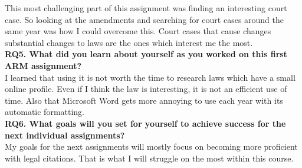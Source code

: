 \documentclass[12pt]{article}
\begin{document}
This most challenging part of this assignment was finding an interesting court case. So looking at the amendments and searching for court cases around the same year was how I could overcome this. Court cases that cause changes substantial changes to laws are the ones which interest me the most. \\

\textbf{RQ5. What did you learn about yourself as you worked on this first ARM assignment?} \\

I learned that using it is not worth the time to research laws which have a small online profile. Even if I think the law is interesting, it is not an efficient use of time. Also that Microsoft Word gets more annoying to use each year with its automatic formatting. \\

\textbf{RQ6. What goals will you set for yourself to achieve success for the next individual assignments?} \\

My goals for the next assignments will mostly focus on becoming more proficient with legal citations. That is what I will struggle on the most within this course. 
\\

\newpage
\printbibliography
\end{document}
